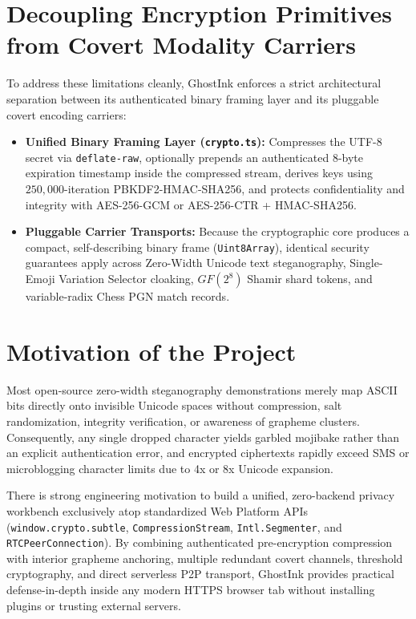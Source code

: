 \documentclass[12pt,a4paper,oneside,openany]{report}
\begin{document}
\section{Decoupling Encryption Primitives from Covert Modality Carriers}
To address these limitations cleanly, GhostInk enforces a strict architectural separation between its authenticated binary framing layer and its pluggable covert encoding carriers:
\begin{itemize}
    \item \textbf{Unified Binary Framing Layer (\texttt{crypto.ts}):} Compresses the UTF-8 secret via \texttt{deflate-raw}, optionally prepends an authenticated $8$-byte expiration timestamp inside the compressed stream, derives keys using $250{,}000$-iteration PBKDF2-HMAC-SHA256, and protects confidentiality and integrity with AES-256-GCM or AES-256-CTR + HMAC-SHA256.
    \item \textbf{Pluggable Carrier Transports:} Because the cryptographic core produces a compact, self-describing binary frame (\texttt{Uint8Array}), identical security guarantees apply across Zero-Width Unicode text steganography, Single-Emoji Variation Selector cloaking, $GF(2^8)$ Shamir shard tokens, and variable-radix Chess PGN match records.
\end{itemize}

\section{Motivation of the Project}
Most open-source zero-width steganography demonstrations merely map ASCII bits directly onto invisible Unicode spaces without compression, salt randomization, integrity verification, or awareness of grapheme clusters. Consequently, any single dropped character yields garbled mojibake rather than an explicit authentication error, and encrypted ciphertexts rapidly exceed SMS or microblogging character limits due to 4x or 8x Unicode expansion.

There is strong engineering motivation to build a unified, zero-backend privacy workbench exclusively atop standardized Web Platform APIs (\texttt{window.crypto.subtle}, \texttt{CompressionStream}, \texttt{Intl.Segmenter}, and \texttt{RTCPeerConnection}). By combining authenticated pre-encryption compression with interior grapheme anchoring, multiple redundant covert channels, threshold cryptography, and direct serverless P2P transport, GhostInk provides practical defense-in-depth inside any modern HTTPS browser tab without installing plugins or trusting external servers.
\end{document}
